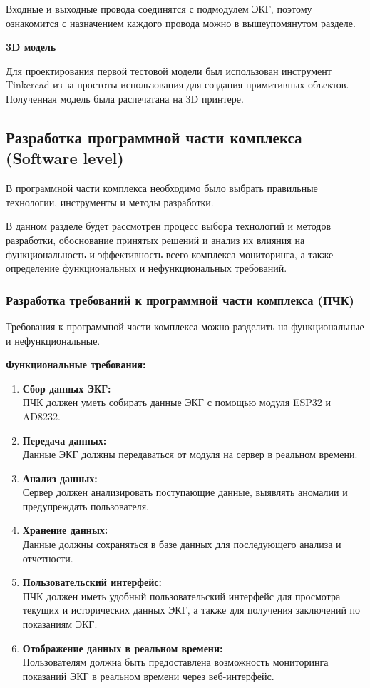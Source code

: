 \documentclass[12pt, russian]{extarticle}
\begin{document}
\begin{spacing}{1.5}
Входные и выходные провода соединятся с подмодулем ЭКГ, поэтому ознакомится с назначением каждого провода можно в вышеупомянутом разделе.

\par \noindent \textbf{3D модель}

Для проектирования первой тестовой модели был использован инструмент Tinkercad из-за простоты использования для создания примитивных объектов. Полученная модель была распечатана на 3D принтере.

\newpage
\subsection{Разработка программной части комплекса (Software level)}

В программной части комплекса необходимо было выбрать правильные технологии, инструменты и методы разработки.

В данном разделе будет рассмотрен процесс выбора технологий и методов разработки, обоснование принятых решений и анализ их влияния на функциональность и эффективность всего комплекса мониторинга, а также определение функциональных и нефункциональных требований.

\subsubsection{Разработка требований к программной части комплекса (ПЧК)}

Требования к программной части комплекса можно разделить на функциональные и нефункциональные.

\noindent
\textbf{Функциональные требования:}

\begin{enumerate}
    \item \textbf{Сбор данных ЭКГ:} \\
        ПЧК должен уметь собирать данные ЭКГ с помощью модуля ESP32 и AD8232.
    \item \textbf{Передача данных:} \\
        Данные ЭКГ должны передаваться от модуля на сервер в реальном времени.
    \item \textbf{Анализ данных:} \\
        Сервер должен анализировать поступающие данные, выявлять аномалии и предупреждать пользователя.
    \item \textbf{Хранение данных:} \\
        Данные должны сохраняться в базе данных для последующего анализа и отчетности.
    \item \textbf{Пользовательский интерфейс:} \\
        ПЧК должен иметь удобный пользовательский интерфейс для просмотра текущих и исторических данных ЭКГ, а также для получения заключений по показаниям ЭКГ.
    \item \textbf{Отображение данных в реальном времени:} \\
        Пользователям должна быть предоставлена
        возможность мониторинга показаний ЭКГ в реальном времени через веб-интерфейс.
\end{enumerate}


\end{spacing}
\end{document}
